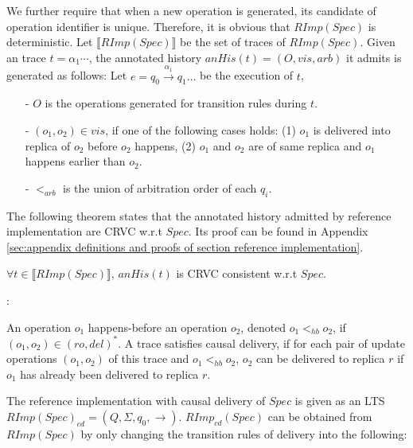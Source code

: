 
We further require that when a new operation is generated, its candidate of operation identifier is unique. Therefore, it is obvious that $RImp(Spec)$ is deterministic. Let $\llbracket RImp(Spec) \rrbracket$ be the set of traces of $RImp(Spec)$. Given an trace $ t= \alpha_1 \cdots$, the annotated history  $anHis(t) = (O,\mathit{vis},\mathit{arb})$ it admits is generated as follows: Let $e = q_0 {\xrightarrow{\alpha_1}} q_1 \ldots$ be the execution of $t$,

\begin{itemize}
\setlength{\itemsep}{0.5pt}
\item[-] $O$ is the operations generated for transition rules during $t$. 
    
\item[-] $(o_1,o_2) \in \mathit{vis}$, if one of the following cases holds: (1) $o_1$ is delivered into replica of $o_2$ before $o_2$ happens, (2) $o_1$ and $o_2$ are of same replica and $o_1$ happens earlier than $o_2$.

\item[-] $<_{\mathit{arb}}$ is the union of arbitration order of each $q_i$. 
\end{itemize} 

The following theorem states that the annotated history admitted by reference implementation are CRVC w.r.t $Spec$. Its proof can be found in Appendix \ref{sec:appendix definitions and proofs of section reference implementation}.

\begin{theorem}
\label{lemma:executions of reference implementation are SRV consistent}
$\forall t \in \llbracket RImp(Spec) \rrbracket$, $anHis(t)$ is CRVC consistent w.r.t $Spec$. 
\end{theorem}


:

An operation $o_1$ happens-before \cite{Lamport:1978} an operation $o_2$, denoted $o_1 <_{\mathit{hb}} o_2$, if $(o_1,o_2) \in (\mathit{ro},\mathit{del})^*$. A trace satisfies causal delivery, if for each pair of update operations $(o_1,o_2)$ of this trace and $o_1 <_{\mathit{hb}} o_2$, $o_2$ can be delivered to replica $r$ if $o_1$ has already been delivered to replica $r$. 

The reference implementation with causal delivery of $Spec$ is given as an LTS $RImp(Spec)_{\mathit{cd}} = (Q,\Sigma,q_0,\rightarrow)$. $RImp_{\mathit{cd}}(Spec)$ can be obtained from $RImp(Spec)$ by only changing the transition rules of delivery into the following: 

